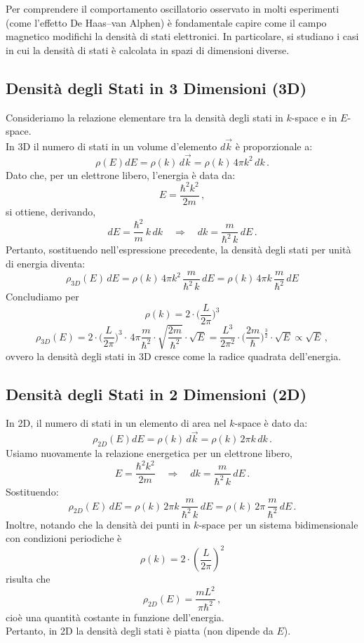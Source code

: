 Per comprendere il comportamento oscillatorio osservato in molti esperimenti (come l'effetto De Haas--van Alphen) è fondamentale capire come il campo magnetico modifichi la densità di stati elettronici. In particolare, si studiano i casi in cui la densità di stati è calcolata in spazi di dimensioni diverse.

\subsection*{Densità degli Stati in 3 Dimensioni (3D)}

Consideriamo la relazione elementare tra la densità degli stati in \(k\)-space e in \(E\)-space.\\
In 3D il numero di stati in un volume d'elemento \(d\vec{k}\) è proporzionale a:
\[
\rho(E)dE = \rho(k) \, d\vec{k} = \rho(k) \, 4\pi k^2 \, dk\,.
\]
Dato che, per un elettrone libero, l'energia è data da:
\[
E = \frac{\hbar^2 k^2}{2m}\,,
\]
si ottiene, derivando,
\[
dE = \frac{\hbar^2}{m}\, k\, dk \quad \Longrightarrow \quad dk = \frac{m}{\hbar^2\, k}\, dE\,.
\]
Pertanto, sostituendo nell'espressione precedente, la densità degli stati per unità di energia diventa:
\[
\rho_{3D}(E)\, dE = \rho(k) \, 4\pi k^2 \, \frac{m}{\hbar^2\, k}\, dE 
= \rho(k) \, 4\pi k \,\frac{m}{\hbar^2}\, dE
\]
Concludiamo per 
\[\rho(k) = 2\cdot \biggr(\frac{L}{2\pi}\biggr)^3 \]
\[
\rho_{3D}(E) = 2\cdot \biggr(\frac{L}{2\pi}\biggr)^3 \cdot \, 4\pi \frac{m}{\hbar^2}\cdot \sqrt{\frac{2m}{\hbar^2}}\cdot \sqrt{E} = \frac{L^3}{2\pi^2}\cdot \biggr(\frac{2m}{\hbar}\biggr)^\frac{3}{2}\cdot \sqrt{E}\propto \sqrt{E}\,,
\]
ovvero la densità degli stati in 3D cresce come la radice quadrata dell'energia.
\subsection*{Densità degli Stati in 2 Dimensioni (2D)}

In 2D, il numero di stati in un elemento di area nel \(k\)-space è dato da:
\[
\rho_{2D}(E)dE = \rho(k) \, d\vec{k} = \rho(k)\, 2\pi k\, dk\,.
\]
Usiamo nuovamente la relazione energetica per un elettrone libero,
\[
E = \frac{\hbar^2 k^2}{2m} \quad \Longrightarrow \quad dk = \frac{m}{\hbar^2\, k}\,dE\,.
\]
Sostituendo:
\[
\rho_{2D}(E)\, dE = \rho(k)\, 2\pi k\, \frac{m}{\hbar^2\, k}\, dE
= \rho(k)\, 2\pi\, \frac{m}{\hbar^2}\, dE\,.
\]
Inoltre, notando che la densità dei punti in \(k\)-space per un sistema bidimensionale con condizioni periodiche è 
\[\rho(k) = 2\cdot \left(\frac{L}{2\pi}\right)^2\]
risulta che
\[
\rho_{2D}(E) = \frac{mL^2}{\pi\hbar^2}\,,
\]
cioè una quantità costante in funzione dell'energia.  \\
Pertanto, in 2D la densità degli stati è piatta (non dipende da \(E\)).

